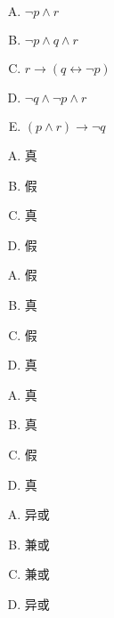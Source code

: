 {{        %
        \begin{practices}
            \begin{enumerate}[A.]
                \item $\neg p \wedge r$
                \item $\neg p \wedge q \wedge r$
                \item $r \rightarrow (q \leftrightarrow \neg p)$
                \item $\neg q \wedge \neg p \wedge r$
                \item $(p \wedge r) \rightarrow \neg q$
            \end{enumerate}
        \end{practices}

        \begin{practices}
            \begin{enumerate}[A.]
                \item 真
                \item 假
                \item 真
                \item 假
            \end{enumerate}
        \end{practices}

        \begin{practices}
            \begin{enumerate}[A.]
                \item 假
                \item 真
                \item 假
                \item 真
            \end{enumerate}
        \end{practices}

        \begin{practices}
            \begin{enumerate}[A.]
                \item 真
                \item 真
                \item 假
                \item 真
            \end{enumerate}
        \end{practices}

        \begin{practices}
            \begin{enumerate}[A.]
                \item 异或
                \item 兼或
                \item 兼或
                \item 异或
            \end{enumerate}
        \end{practices}

}}
